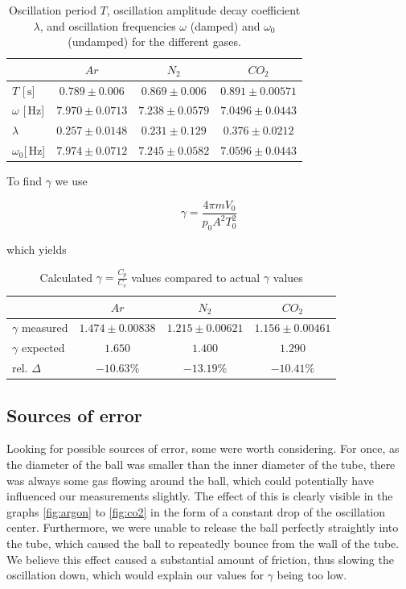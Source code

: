\documentclass{scrreprt}
\newcommand{\unit}[1]{\ensuremath{\, \mathrm{#1}}}
\begin{document}
\begin{table}[H]
\center
\begin{tabular}{|l|ccc|}
\hline
	&	$Ar$ & $N_2$		&	$CO_2$\\ \hline\hline
$T$ [$\unit{s}$] & $0.789 \pm 0.006$ & $0.869 \pm 0.006$  & $0.891 \pm 0.00571$\\\hline\hline
$\omega$ [$\unit{Hz}$] & $7.970 \pm 0.0713$ & $7.238 \pm 0.0579$ & $7.0496 \pm 0.0443$\\\hline
$\lambda$ & $0.257 \pm 0.0148$ & $0.231 \pm 0.129$ & $0.376 \pm 0.0212$\\ \hline
$\omega_0$[$\unit{Hz}$] & $7.974 \pm 0.0712$ & $7.245 \pm 0.0582$ & $7.0596 \pm 0.0443$ \\ \hline

\end{tabular}
\caption{Oscillation period $T$, oscillation amplitude decay coefficient $\lambda$, and oscillation frequencies $\omega$ (damped) and $\omega_0$ (undamped) for the different gases.}
\end{table}

To find $\gamma$ we use 

\begin{equation}
\gamma = \frac{4 \pi m V_0}{p_0 A^2 T_0^2}
\end{equation}

which yields

\begin{table}[H]
\center
\begin{tabular}{|l|ccc|}
\hline
	&	$Ar$ & $N_2$		&	$CO_2$\\ \hline\hline
$\gamma$ measured & $1.474 \pm 0.00838$ & $1.215 \pm 0.00621$  & $1.156 \pm 0.00461$\\\hline
$\gamma$ expected & $1.650$ & $1.400$ & $1.290$\\ \hline
rel. $\Delta$ & $-10.63\%$ & $-13.19\%$ & $-10.41\%$\\ \hline

\end{tabular}
\caption{Calculated $\gamma = \frac{C_p}{C_v}$ values compared to actual $\gamma$ values }
\end{table}

\subsection{Sources of error}
\label{sec:error}
Looking for possible sources of error, some were worth considering. For once, as the diameter of the ball was smaller than the inner diameter of the tube, there was always some gas flowing around the ball, which could potentially have influenced our measurements slightly. The effect of this is clearly visible in the graphs \ref{fig:argon} to \ref{fig:co2} in the form of a constant drop of the oscillation center. Furthermore, we were unable to release the ball perfectly straightly into the tube, which caused the ball to repeatedly bounce from the wall of the tube. We believe this effect caused a substantial amount of friction, thus slowing the oscillation down, which would explain our values for $\gamma$ being too low.
\end{document}
